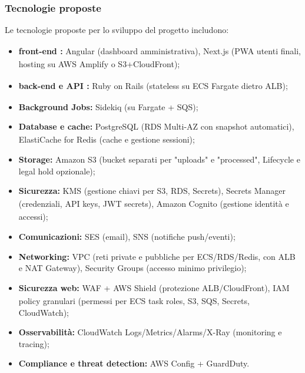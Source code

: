 \documentclass[a4paper,11pt]{article}
\begin{document}
\subsubsection{Tecnologie proposte}
Le tecnologie proposte per lo sviluppo\textsubscript{}
 del progetto\textsubscript{}
 includono:
\begin{itemize}[noitemsep, topsep=0pt]
 \item \textbf{front-end\textsubscript{}
:} Angular\textsubscript{} (dashboard\textsubscript{}
 amministrativa), Next.js (PWA\textsubscript{}
 utenti finali, hosting su AWS\textsubscript{}
 Amplify o S3+CloudFront);
 \item \textbf{back-end\textsubscript{}
 e API\textsubscript{}
:} Ruby on Rails\textsubscript{} (stateless su ECS Fargate dietro ALB);
 \item \textbf{Background Jobs:} Sidekiq (su Fargate + SQS);
 \item \textbf{Database e cache:} PostgreSQL\textsubscript{} (RDS Multi-AZ con snapshot automatici), ElastiCache for Redis (cache e gestione sessioni);
 \item \textbf{Storage:} Amazon S3 (bucket separati per "uploads" e "processed", Lifecycle e legal hold opzionale);
 \item \textbf{Sicurezza\textsubscript{}:} KMS (gestione chiavi per S3, RDS, Secrets), Secrets Manager (credenziali, API\textsubscript{}
 keys, JWT secrets), Amazon Cognito (gestione identità e accessi);
 \item \textbf{Comunicazioni:} SES (email), SNS (notifiche push/eventi);
 \item \textbf{Networking:} VPC (reti private e pubbliche per ECS/RDS/Redis, con ALB e NAT Gateway), Security Groups (accesso minimo privilegio);
 \item \textbf{Sicurezza web:} WAF + AWS\textsubscript{}
 Shield (protezione ALB/CloudFront), IAM policy granulari (permessi per ECS task roles, S3, SQS, Secrets, CloudWatch);
 \item \textbf{Osservabilità:} CloudWatch Logs/Metrics/Alarms/X-Ray (monitoring e tracing);
 \item \textbf{Compliance e threat detection:} AWS\textsubscript{}
 Config + GuardDuty.
\end{itemize}
\end{document}
